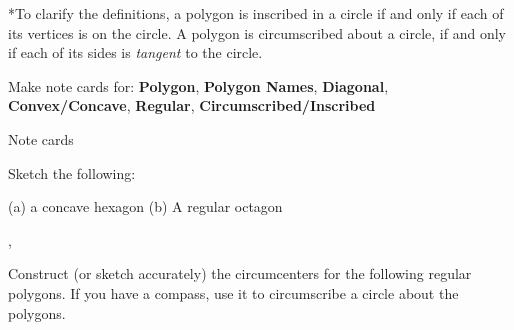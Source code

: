 \medskip

\noindent **To clarify the definitions, a polygon is inscribed in a circle
if and only if each of its vertices is on the circle.
A polygon is circumscribed about a circle,
if and only if each of its sides is \emph{tangent} to the circle.

\begin{exercises}

	\begin{ex} \e Make note cards for:  \textbf{Polygon}, \textbf{Polygon Names}, \textbf{Diagonal}, \textbf{Convex/Concave}, \textbf{Regular}, \textbf{Circumscribed/Inscribed}
	\begin{sol}
	Note cards
	\end{sol}
	\end{ex}
	
	\begin{ex}
	\e Sketch the following:
	
	(a) a concave hexagon \hspace*{\fill} (b) A regular octagon
	
	\begin{sol}
	
	,
	\end{sol}
	\end{ex}
	
	\medskip
	\newpage

	\begin{ex} \e Construct (or sketch accurately) the circumcenters for the following regular polygons.  If you have a compass, use it to circumscribe a circle about the polygons.\\\\

\begin{center}
\end{center}
\end{ex}
\end{exercises}

